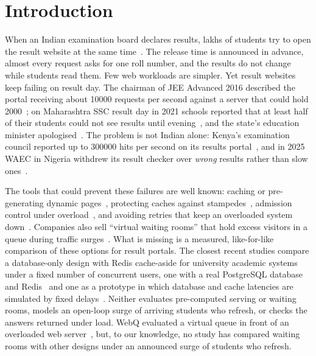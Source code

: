 \section{Introduction}

When an Indian examination board declares results, lakhs of students try to
open the result website at the same time~\cite{ht2021ssc}. The release time is
announced in advance, almost every request asks for one roll number, and the
results do not change while students read them. Few web workloads are simpler.
Yet result websites keep failing on result day. The chairman
of JEE Advanced 2016 described the portal receiving about \num{10000} requests
per second against a server that could hold \num{2000}~\cite{pagalguy2016jee};
on Maharashtra SSC result day in 2021 schools reported that at least half of
their students could not see results until evening~\cite{ht2021ssc}, and the
state's education minister apologised~\cite{careerindia2021ssc}. The problem is
not Indian alone: Kenya's examination council reported up to \num{300000} hits
per second on its results portal~\cite{knec2025x,k24knec2025}, and in 2025 WAEC
in Nigeria withdrew its result
checker over \emph{wrong} results rather than slow ones~\cite{icir2025waec}.

The tools that could prevent these failures are well known: caching or
pre-generating dynamic pages~\cite{challenger1999scalable,labrinidis2000webview},
protecting caches against stampedes~\cite{vattani2015xfetch,nishtala2013memcache},
admission control under overload~\cite{welsh2001seda,elnikety2004gatekeeper,chen2005news},
and avoiding retries that keep an overloaded system
down~\cite{bronson2021metastable,huang2022metastable}. Companies also sell
``virtual waiting rooms'' that hold excess visitors in a queue during traffic
surges~\cite{cloudflare2026wr,aws2022vwr}. What is missing is a measured,
like-for-like comparison of these options for result portals. The closest
recent studies compare a database-only design with Redis cache-aside for
university academic systems under a fixed number of concurrent users, one with
a real PostgreSQL database and Redis~\cite{putranto2026redis} and one as a
prototype in which database
and cache latencies are simulated by fixed delays~\cite{tofan2026cacheaside}.
Neither evaluates pre-computed serving or waiting rooms, models an open-loop
surge of arriving students who refresh, or checks the answers returned under
load. WebQ evaluated a virtual queue in front of an overloaded web
server~\cite{doshi2015webq}, but, to our knowledge, no study has compared
waiting rooms with other designs under an announced surge of students who
refresh.

